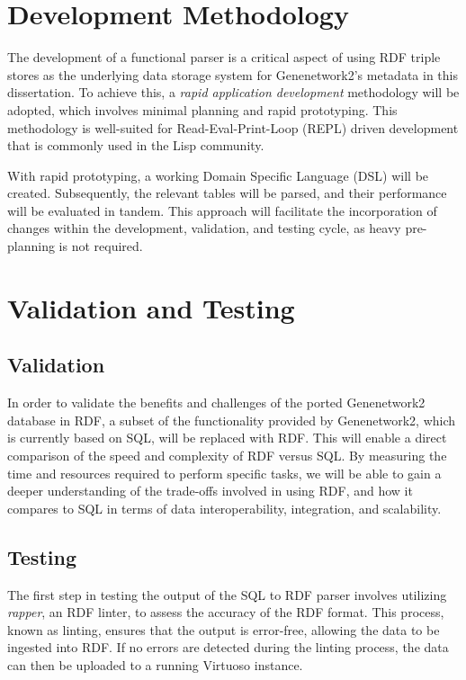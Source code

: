 \section{Development Methodology}

The development of a functional parser is a critical aspect of using RDF triple stores as the underlying data storage system for Genenetwork2's metadata in this dissertation. To achieve this, a \textit{rapid application development} methodology will be adopted, which involves minimal planning and rapid prototyping. This methodology is well-suited for Read-Eval-Print-Loop (REPL) driven development that is commonly used in the Lisp community.

With rapid prototyping, a working Domain Specific Language (DSL) will be created. Subsequently, the relevant tables will be parsed, and their performance will be evaluated in tandem. This approach will facilitate the incorporation of changes within the development, validation, and testing cycle, as heavy pre-planning is not required.

\section{Validation and Testing}

\subsection{Validation}

In order to validate the benefits and challenges of the ported Genenetwork2 database in RDF, a subset of the functionality provided by Genenetwork2, which is currently based on SQL, will be replaced with RDF.  This will enable a direct comparison of the speed and complexity of RDF versus SQL.  By measuring the time and resources required to perform specific tasks, we will be able to gain a deeper understanding of the trade-offs involved in using RDF, and how it compares to SQL in terms of data interoperability, integration, and scalability.

\subsection{Testing}

The first step in testing the output of the SQL to RDF parser involves utilizing \textit{rapper}, an RDF linter, to assess the accuracy of the RDF format.  This process, known as linting, ensures that the output is error-free, allowing the data to be ingested into RDF.  If no errors are detected during the linting process, the data can then be uploaded to a running Virtuoso instance.

